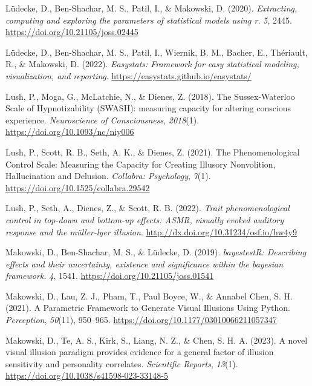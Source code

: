 \documentclass[
  man,
  floatsintext,
  longtable,
  nolmodern,
  notxfonts,
  notimes,
  colorlinks=true,linkcolor=blue,citecolor=blue,urlcolor=blue]{apa7}
\newlength{\cslhangindent}
\newenvironment{CSLReferences}[2] %
 {\begin{list}{}{%
  \setlength{\itemindent}{0pt}
  \setlength{\leftmargin}{0pt}
  \setlength{\parsep}{0pt}
  \ifodd #1
   \setlength{\leftmargin}{\cslhangindent}
   \setlength{\itemindent}{-1\cslhangindent}
  \fi
  \setlength{\itemsep}{#2\baselineskip}}}
 {\end{list}}
\begin{document}
\begin{CSLReferences}{1}{0}
Lüdecke, D., Ben-Shachar, M. S., Patil, I., \& Makowski, D. (2020).
\emph{Extracting, computing and exploring the parameters of statistical
models using {\textbraceleft}r{\textbraceright}.} \emph{5}, 2445.
\url{https://doi.org/10.21105/joss.02445}

Lüdecke, D., Ben-Shachar, M. S., Patil, I., Wiernik, B. M., Bacher, E.,
Thériault, R., \& Makowski, D. (2022). \emph{Easystats: Framework for
easy statistical modeling, visualization, and reporting}.
\url{https://easystats.github.io/easystats/}

Lush, P., Moga, G., McLatchie, N., \& Dienes, Z. (2018). The
Sussex-Waterloo Scale of Hypnotizability (SWASH): measuring capacity for
altering conscious experience. \emph{Neuroscience of Consciousness},
\emph{2018}(1). \url{https://doi.org/10.1093/nc/niy006}

Lush, P., Scott, R. B., Seth, A. K., \& Dienes, Z. (2021). The
Phenomenological Control Scale: Measuring the Capacity for Creating
Illusory Nonvolition, Hallucination and Delusion. \emph{Collabra:
Psychology}, \emph{7}(1). \url{https://doi.org/10.1525/collabra.29542}

Lush, P., Seth, A., Dienes, Z., \& Scott, R. B. (2022). \emph{Trait
phenomenological control in top-down and bottom-up effects: ASMR,
visually evoked auditory response and the müller-lyer illusion}.
\url{http://dx.doi.org/10.31234/osf.io/hw4y9}

Makowski, D., Ben-Shachar, M. S., \& Lüdecke, D. (2019).
\emph{bayestestR: Describing effects and their uncertainty, existence
and significance within the bayesian framework.} \emph{4}, 1541.
\url{https://doi.org/10.21105/joss.01541}

Makowski, D., Lau, Z. J., Pham, T., Paul Boyce, W., \& Annabel Chen, S.
H. (2021). A Parametric Framework to Generate Visual Illusions Using
Python. \emph{Perception}, \emph{50}(11), 950--965.
\url{https://doi.org/10.1177/03010066211057347}

Makowski, D., Te, A. S., Kirk, S., Liang, N. Z., \& Chen, S. H. A.
(2023). A novel visual illusion paradigm provides evidence for a general
factor of illusion sensitivity and personality correlates.
\emph{Scientific Reports}, \emph{13}(1).
\url{https://doi.org/10.1038/s41598-023-33148-5}


\end{CSLReferences}
\end{document}
